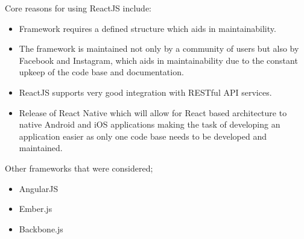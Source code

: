 Core reasons for using ReactJS include:
\begin{itemize}
	\item Framework requires a defined structure which aids in maintainability.
	\item The framework is maintained not only by a community of users but also
	by Facebook and Instagram, which aids in maintainability due to the 
	constant upkeep of the code base and documentation.
	\item ReactJS supports very good integration with RESTful API services.
	\item Release of React Native which will allow for React based architecture 
	to native Android and iOS applications making the task of developing an 
	application easier as only one code base needs to be developed and maintained.
\end{itemize}

Other frameworks that were considered;
\begin{itemize}
	\item AngularJS
	\item Ember.js 
	\item Backbone.js
\end{itemize}